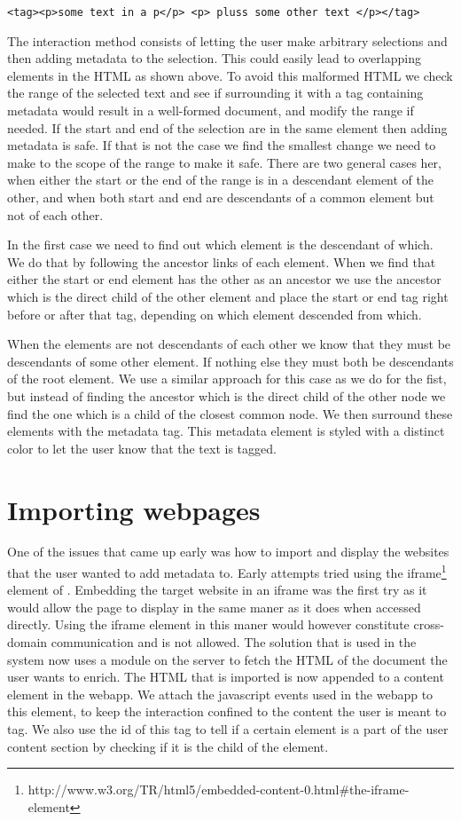 \texttt{<tag><p>some text in a p</p> <p> pluss some other text </p></tag>}

The interaction method consists of letting the user make arbitrary selections and then adding metadata to the selection.
This could easily lead to overlapping elements in the HTML as shown above.
To avoid this malformed HTML we check the range of the selected text and see if surrounding it with a tag
containing metadata would result in a well-formed document, and modify the range if needed.
If the start and end of the selection are in the same element then adding metadata is safe.
If that is not the case we find the smallest change we need to make to the scope of the range to make it safe.
There are two general cases her, when either the start or the end of the range is in a descendant element of the other,
and when both start and end are descendants of a common element but not of each other.

In the first case we need to find out which element is the descendant of which.
We do that by following the ancestor links of each element.
When we find that either the start or end element has the other as an ancestor we use the ancestor which is the direct
child of the other element and place the start or end tag right before or after that tag, depending on which element
descended from which.

When the elements are not descendants of each other we know that they must be descendants of some other element.
If nothing else they must both be descendants of the root element.
We use a similar approach for this case as we do for the fist,
but instead of finding the ancestor which is the direct child of the other node we find the one which is a child of the
closest common node.
We then surround these elements with the metadata tag.
This metadata element is styled with a distinct color to let the user know that the text is tagged.

\section{Importing webpages}
One of the issues that came up early was how to import and display the websites that the user wanted to add metadata to.
Early attempts tried using the iframe\footnote{http://www.w3.org/TR/html5/embedded-content-0.html\#the-iframe-element}
element of .
Embedding the target website in an iframe was the first try as it would allow the page to display in the same maner
as it does when accessed directly.
Using the iframe element in this maner would however constitute cross-domain communication and is not allowed.
The solution that is used in the system now uses a module on the server to fetch the HTML of the document the user wants to enrich.
The HTML that is imported is now appended to a content element in the webapp.
We attach the javascript events used in the webapp to this element,
to keep the interaction confined to the content the user is meant to tag.
We also use the id of this tag to tell if a certain element is a part of the user content section by checking if it is
the child of the element.

